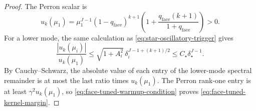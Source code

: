 \documentclass[11pt]{article}
\begin{document}
\begin{proof}
The Perron scalar is
\[
 u_k(\mu_1)=\mu_1^{J-1}(1-q_{\mathrm{face}})^{k+1}
 \left(1+\frac{q_{\mathrm{face}}(k+1)}{1+q_{\mathrm{face}}}\right)>0.
\]
For a lower mode, the same calculation as
\eqref{eq:star-oscillatory-trigger} gives
\[
 \frac{|u_k(\mu_i)|}{u_k(\mu_1)}
 \leq\sqrt{1+A_i^2}\,
 \delta_i^{J-1+(k+1)/2}
 \leq C_\star\delta_\star^{J-1}.
\]
By Cauchy--Schwarz, the absolute value of each entry of the lower-mode
spectral remainder is at most the last ratio times $u_k(\mu_1)$.  The Perron
rank-one entry is at least $\gamma^2u_k(\mu_1)$, so
\eqref{eq:face-tuned-warmup-condition} proves
\eqref{eq:face-tuned-kernel-margin}.
\end{proof}



\end{document}
